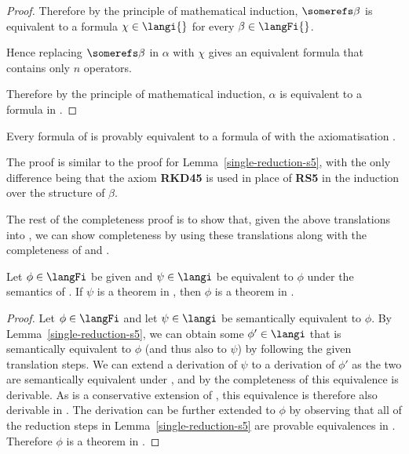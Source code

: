 \begin{proof}
Therefore by the principle of mathematical induction, $\somerefs \beta$ is
equivalent to a formula $\chi \in \langi{}$ for every $\beta \in \langFi{}$.

Hence replacing $\somerefs \beta$ in $\alpha$ with $\chi$ gives an equivalent
formula that contains only $n$ \somerefs{} operators.

Therefore by the principle of mathematical induction, $\alpha$ is equivalent to
a formula in \langi{}.
\end{proof}

\begin{lemma}\label{single-reduction-kd45}
Every formula of \langFi{} is provably equivalent to a formula of \langi{} with
the axiomatisation \axiomKDiF{}.
\end{lemma}

The proof is similar to the proof for Lemma~\ref{single-reduction-s5}, with the
only difference being that the axiom {\bf RKD45} is used in place of {\bf RS5}
in the induction over the structure of $\beta$.

The rest of the completeness proof is to show that, given the above translations
into \langi{}, we can show completeness by using these translations along with
the completeness of \logicSi{} and \logicKDi{}.

\begin{corollary}\label{single-derivable-s5}
Let $\phi \in \langFi$ be given and $\psi \in \langi$ be equivalent to $\phi$
under the semantics of \logicSiF{}.  If $\psi$ is a theorem in \logicSi{}, then
$\phi$ is a theorem in \axiomSiF{}.
\end{corollary}

\begin{proof}
Let $\phi \in \langFi$ and let $\psi \in \langi$ be semantically equivalent to
$\phi$. By Lemma~\ref{single-reduction-s5}, we can obtain some $\phi' \in \langi$
that is semantically equivalent to $\phi$ (and thus also to $\psi$) by following
the given translation steps. We can extend a derivation of $\psi$ to a
derivation of $\phi'$ as the two are semantically equivalent under \logicSi{}, and by
the completeness of \logicSi{} this equivalence is derivable. As \axiomSiF{} is a
conservative extension of \logicSi{}, this equivalence is therefore also derivable
in \axiomSiF{}. The derivation can be further extended to $\phi$ by observing that all
of the reduction steps in Lemma~\ref{single-reduction-s5} are provable equivalences
in \axiomSiF{}. Therefore $\phi$ is a theorem in \axiomSiF{}.
\end{proof}

